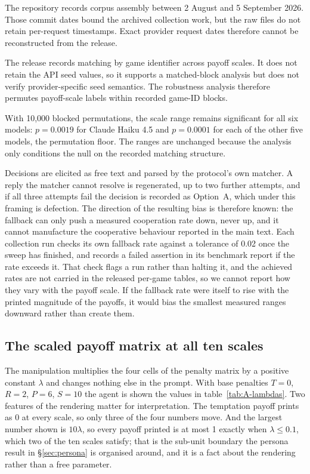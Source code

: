 \documentclass[openacc]{rsproca_new}
\newcommand{\lam}{\lambda}
\begin{document}
The repository records corpus assembly between 2 August and 5 September 2026.
Those commit dates bound the archived collection work, but the raw files do not
retain per-request timestamps. Exact provider request dates therefore cannot be
reconstructed from the release.

The release records matching by game identifier across payoff scales. It does
not retain the API seed values, so it supports a matched-block analysis but
does not verify provider-specific seed semantics. The robustness analysis
therefore permutes payoff-scale labels within recorded game-ID blocks.

With 10,000 blocked permutations, the scale range remains significant for all
six models: $p=0.0019$ for Claude Haiku 4.5 and $p=0.0001$ for each of the
other five models, the permutation floor. The ranges are unchanged because the
analysis only conditions the null on the recorded matching structure.

Decisions are elicited as free text and parsed by the protocol's own matcher. A
reply the matcher cannot resolve is regenerated, up to two further attempts,
and if all three attempts fail the decision is recorded as Option~A, which
under this framing is defection. The direction of the resulting bias is
therefore known: the fallback can only push a measured cooperation rate down,
never up, and it cannot manufacture the cooperative behaviour reported in the
main text. Each collection run checks its own fallback rate against a tolerance
of 0.02 once the sweep has finished, and records a failed assertion in its
benchmark report if the rate exceeds it. That check flags a run rather than
halting it, and the achieved rates are not carried in the released per-game
tables, so we cannot report how they vary with the payoff scale. If the fallback rate were itself to rise with the printed magnitude of
the payoffs, it would bias the smallest measured ranges downward rather than
create them.

\subsection{The scaled payoff matrix at all ten scales}\label{appendix:payoff_scaling}

The manipulation multiplies the four cells of the penalty matrix by a positive
constant $\lam$ and changes nothing else in the prompt. With base penalties
$T = 0$, $R = 2$, $P = 6$, $S = 10$ the agent is shown the values in
table~\ref{tab:A-lambdas}. Two features of the rendering matter for
interpretation. The temptation payoff prints as 0 at every scale, so only three
of the four numbers move. And the largest number shown is $10\lam$, so every
payoff printed is at most 1 exactly when $\lam \leq 0.1$, which two of the ten
scales satisfy; that is the sub-unit boundary the persona result in
\S\ref{sec:persona} is organised around, and it is a fact about the rendering
rather than a free parameter.
\end{document}
